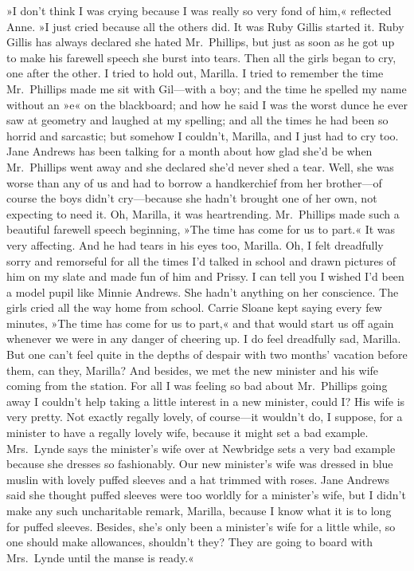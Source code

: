 »I don't think I was crying because I was really so very fond of him,« reflected Anne. »I just cried because all the others did. It was Ruby Gillis started it. Ruby Gillis has always declared she hated Mr.~Phillips, but just as soon as he got up to make his farewell speech she burst into tears. Then all the girls began to cry, one after the other. I tried to hold out, Marilla. I tried to remember the time Mr.~Phillips made me sit with Gil—with a boy; and the time he spelled my name without an »e« on the blackboard; and how he said I was the worst dunce he ever saw at geometry and laughed at my spelling; and all the times he had been so horrid and sarcastic; but somehow I couldn't, Marilla, and I just had to cry too. Jane Andrews has been talking for a month about how glad she'd be when Mr.~Phillips went away and she declared she'd never shed a tear. Well, she was worse than any of us and had to borrow a handkerchief from her brother—of course the boys didn't cry—because she hadn't brought one of her own, not expecting to need it. Oh, Marilla, it was heartrending. Mr.~Phillips made such a beautiful farewell speech beginning, »The time has come for us to part.« It was very affecting. And he had tears in his eyes too, Marilla. Oh, I felt dreadfully sorry and remorseful for all the times I'd talked in school and drawn pictures of him on my slate and made fun of him and Prissy. I can tell you I wished I'd been a model pupil like Minnie Andrews. She hadn't anything on her conscience. The girls cried all the way home from school. Carrie Sloane kept saying every few minutes, »The time has come for us to part,« and that would start us off again whenever we were in any danger of cheering up. I do feel dreadfully sad, Marilla. But one can't feel quite in the depths of despair with two months' vacation before them, can they, Marilla? And besides, we met the new minister and his wife coming from the station. For all I was feeling so bad about Mr.~Phillips going away I couldn't help taking a little interest in a new minister, could I? His wife is very pretty. Not exactly regally lovely, of course—it wouldn't do, I suppose, for a minister to have a regally lovely wife, because it might set a bad example. Mrs.~Lynde says the minister's wife over at Newbridge sets a very bad example because she dresses so fashionably. Our new minister's wife was dressed in blue muslin with lovely puffed sleeves and a hat trimmed with roses. Jane Andrews said she thought puffed sleeves were too worldly for a minister's wife, but I didn't make any such uncharitable remark, Marilla, because I know what it is to long for puffed sleeves. Besides, she's only been a minister's wife for a little while, so one should make allowances, shouldn't they? They are going to board with Mrs.~Lynde until the manse is ready.«

